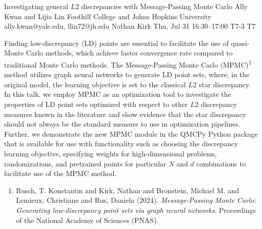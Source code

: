 \documentclass[12pt,lettersize,oneside]{book} %
\begin{document}
\begin{talk}
  {Investigating general $L2$ discrepancies with Message-Passing Monte Carlo}%
  {Ally Kwan and Lijia Lin}%
  {Foothill College and Johns Hopkins University}%
  {ally.kwan@yale.edu, llin72@jh.edu}%
  {Nathan Kirk}%
  {}%
  {Thu, Jul 31 16:30--17:00}%
  {T7-3}%
  {T7}%
  {}%
   
Finding low-discrepancy (LD) points are essential to facilitate the use of quasi-Monte Carlo methods, which achieve faster convergence rate compared to traditional Monte Carlo methods. The Message-Passing Monte Carlo (MPMC)\textsuperscript {1} method utilizes graph neural networks to generate LD point sets, where, in the original model, the learning objective is set to the classical $L2$ star discrepancy. In this talk, we employ MPMC as an optimization tool to investigate the properties of LD point sets optimized with respect to other $L2$ discrepancy measures known in the literature and show evidence that the star discrepancy should not always be the standard measure to use in optimization pipelines. Further, we demonstrate the new MPMC module in the QMCPy Python package that is available for use with functionality such as choosing the discrepancy learning objective, specifying weights for high-dimensional problems, randomizations, and pretrained points for particular $N$ and $d$ combinations to facilitate use of the MPMC method.


\begin{enumerate}
 \item[{[1]}] Rusch, T. Konstantin and Kirk, Nathan and Bronstein, Michael M. and Lemieux, Christiane and Rus, Daniela (2024). {\it Message-Passing Monte Carlo: Generating low-discrepancy point sets via graph neural networks}. Proceedings of the National Academy of Sciences (PNAS).

\end{enumerate}

\end{talk}
\end{document}
